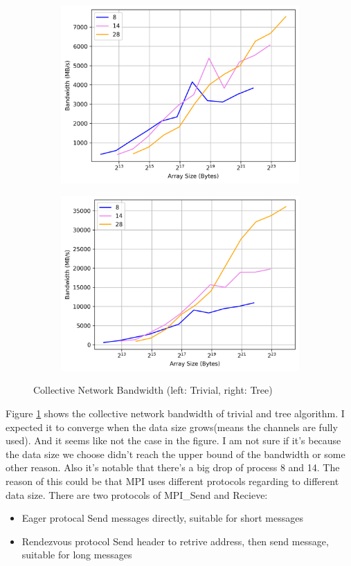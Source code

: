 \documentclass[article]{scrartcl}
\begin{document}
\begin{figure}[ht]
  \begin{subfigure}
    \centering
    \includegraphics[width=.5\linewidth]{../figs/CollectiveBandwidthTrivial.png}  
  \end{subfigure}
  \begin{subfigure}
    \centering
    \includegraphics[width=.5\linewidth]{../figs/CollectiveBandwidthTree.png}  
  \end{subfigure}
  \caption{Collective Network Bandwidth (left: Trivial, right: Tree)}
  \label{fig:CNB}
\end{figure}
Figure \ref{fig:CNB} shows the collective network bandwidth of trivial and tree algorithm. 
I expected it to converge when the data size grows(means the channels are fully used). And it seems like not the case in the figure. I am not sure if it's because the data size we choose didn't reach the upper bound of the bandwidth or some other reason.
Also it's notable that there's a big  drop of process 8 and 14. The reason of this could be that MPI uses different protocols regarding to different data size.
There are two protocols of MPI\_Send and Recieve:
\begin{itemize}
  \item Eager protocal
  \subitem Send messages directly, suitable for short messages
  \item Rendezvous protocol
  \subitem Send header to retrive address, then send message, suitable for long messages
\end{itemize}
\end{document}
